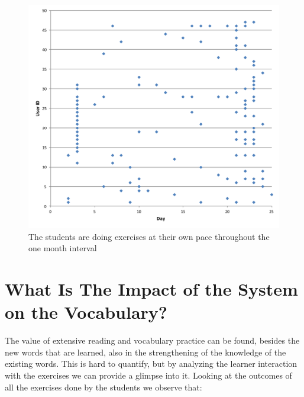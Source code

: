   \begin{figure}[h!]
  \centering
    \includegraphics[width=0.8\columnwidth]{figures/user_exercise_activity_vs_day.pdf}
    \caption{The students are doing exercises at their own pace throughout the one month interval }
    \label{fig:activity_per_day}
  \end{figure}




\section{What Is The Impact of the System on the Vocabulary?}

  The value of extensive reading and vocabulary practice can be found, besides the new words that are learned, also in the strengthening of the knowledge of the existing words. This is hard to quantify, but by analyzing the learner interaction with the exercises we can provide a glimpse into it. Looking at the outcomes of all the exercises done by the students we observe that:

